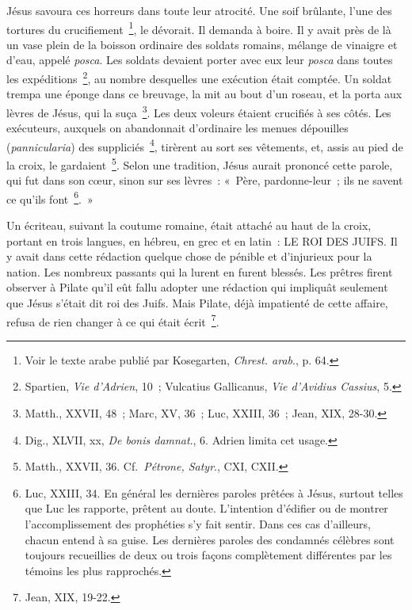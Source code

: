 \documentclass[french,twoside]{book} %
\begin{document}
Jésus savoura ces horreurs dans toute leur atrocité. Une soif brûlante, l’une des tortures du crucifiement \footnote{ Voir le texte arabe publié par Kosegarten, {\itshape Chrest. arab}., p. 64.}, le dévorait. Il demanda à boire. Il y avait près de là un vase plein de la boisson ordinaire des soldats romains, mélange de vinaigre et d’eau, appelé {\itshape posca}. Les soldats devaient porter avec eux leur {\itshape posca} dans toutes les expéditions \footnote{ Spartien, {\itshape Vie d’Adrien}, 10 ; Vulcatius Gallicanus, {\itshape Vie d’Avidius Cassius}, 5.}, au nombre desquelles une exécution était comptée. Un soldat trempa une éponge dans ce breuvage, la mit au bout d’un roseau, et la porta aux lèvres de Jésus, qui la suça \footnote{Matth., XXVII, 48 ; Marc, XV, 36 ; Luc, XXIII, 36 ; Jean, XIX, 28-30.}. Les deux voleurs étaient crucifiés à ses côtés. Les exécuteurs, auxquels on abandonnait d’ordinaire les menues dépouilles ({\itshape pannicularia}) des suppliciés \footnote{ Dig., XLVII, xx, {\itshape De bonis damnat}., 6. Adrien limita cet usage.}, tirèrent au sort ses vêtements, et, assis au pied de la croix, le gardaient \footnote{ Matth., XXVII, 36. Cf. {\itshape Pétrone, Satyr}., CXI, CXII.}. Selon une tradition, Jésus aurait prononcé cette parole, qui fut dans son cœur, sinon sur ses lèvres : « Père, pardonne-leur ; ils ne savent ce qu’ils font \footnote{Luc, XXIII, 34. En général les dernières paroles prêtées à Jésus, surtout telles que Luc les rapporte, prêtent au doute. L’intention d’édifier ou de montrer l’accomplissement des prophéties s’y fait sentir. Dans ces cas d’ailleurs, chacun entend à sa guise. Les dernières paroles des condamnés célèbres sont toujours recueillies de deux ou trois façons complètement différentes par les témoins les plus rapprochés.}. »\par
Un écriteau, suivant la coutume romaine, était attaché au haut de la croix, portant en trois langues, en hébreu, en grec et en latin : LE ROI DES JUIFS. Il y avait dans cette rédaction quelque chose de pénible et d’injurieux pour la nation. Les nombreux passants qui la lurent en furent blessés. Les prêtres firent observer à Pilate qu’il eût fallu adopter une rédaction qui impliquât seulement que Jésus s’était dit roi des Juifs. Mais Pilate, déjà impatienté de cette affaire, refusa de rien changer à ce qui était écrit \footnote{Jean, XIX, 19-22.}.\par
\end{document}
